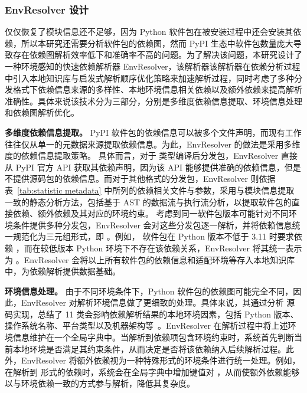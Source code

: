 \subsubsection{EnvResolver 设计}
仅仅恢复了模块信息还不足够，因为 Python 软件包在被安装过程中还会安装其依赖，所以本研究还需要分析软件包的依赖图，然而 PyPI 生态中软件包数量庞大导致存在依赖图解析效率低下和准确率不高的问题。为了解决该问题，本研究设计了一种环境感知的快速依赖解析器 EnvResolver，该解析器该解析器在依赖分析过程中引入本地知识库与启发式解析顺序优化策略来加速解析过程，同时考虑了多种分发格式下依赖信息来源的多样性、本地环境信息相关依赖以及额外依赖来提高解析准确性。具体来说该技术分为三部分，分别是多维度依赖信息提取、环境信息处理和依赖图解析优化。

\textbf{多维度依赖信息提取。}
PyPI 软件包的依赖信息可以被多个文件声明，而现有工作往往仅从单一的元数据来源提取依赖信息。为此，EnvResolver 的做法是采用多维度的依赖信息提取策略。
具体而言，对于  类型编译后分发包，EnvResolver 直接从 PyPI 官方 API 获取其依赖声明，因为该 API 能够提供准确的依赖信息，但是不提供源码包的依赖信息。而对于其他格式的分发包，EnvResolver 则依据表~\ref{tab:statistic metadata} 中所列的依赖相关文件与参数，采用与模块信息提取一致的静态分析方法，包括基于 AST 的数据流与执行流分析，以提取软件包的直接依赖、额外依赖及其对应的环境约束。
考虑到同一软件包版本可能针对不同环境条件提供多种分发包，EnvResolver 会对这些分发包逐一解析，并将依赖信息统一规范化为三元组形式，即 。例如， 软件包在 Python 版本不低于 3.11 时要求依赖 ，而在较低版本 Python 环境下不存在该依赖关系，EnvResolver 将其统一表示为 。EnvResolver 会将以上所有软件包的依赖信息和适配环境等存入本地知识库中，为依赖解析提供数据基础。

\textbf{环境信息处理。}
由于不同环境条件下，Python 软件包的依赖图可能完全不同，因此，EnvResolver 对解析环境信息做了更细致的处理。具体来说，其通过分析  源码实现，总结了 11 类会影响依赖解析结果的本地环境因素，包括 Python 版本、操作系统名称、平台类型以及机器架构等~\cite{depspecifier}。EnvResolver 在解析过程中将上述环境信息维护在一个全局字典中。当解析到依赖项包含环境约束时，系统首先判断当前本地环境是否满足其约束条件，从而决定是否将该依赖纳入后续解析过程。此外，EnvResolver 将额外依赖视为一种特殊形式的环境条件进行统一处理。例如，在解析到  形式的依赖时，系统会在全局字典中增加键值对 ，从而使额外依赖能够以与环境依赖一致的方式参与解析，降低其复杂度。

